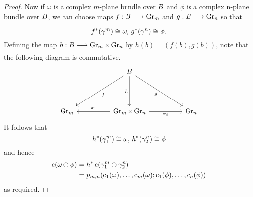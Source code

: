 \documentclass[../main]{subfiles}
\begin{document}
\begin{proof}
Now if $\omega$ is a complex $m$-plane bundle over $B$ and $\phi$ is a complex n-plane bundle over $B$, we can choose maps $f: \base \varrightarrow{} \grassmannian_{m}$ and $g: \base \varrightarrow{} \grassmannian_{n}$ so that
\[
f^{*}(\gamma^{m}) \cong \omega, \, g^{*}(\gamma^{n}) \cong \phi .
\]
Defining the map $h: \base \varrightarrow{} \grassmannian_{m} \times \grassmannian_{n}$ by $h(b)=(f(b), g(b))$, note that the following diagram is commutative.
\[\begin{tikzcd}
	&& \base \\
	{} \\
	{\grassmannian_m} && {\grassmannian_m \times \grassmannian_n} && {\grassmannian_n}
	\arrow["f", from=1-3, to=3-1]
	\arrow["g"', from=1-3, to=3-5]
	\arrow["h"', from=1-3, to=3-3]
	\arrow["{\pi_1}"', from=3-3, to=3-1]
	\arrow["{\pi_2}"', from=3-3, to=3-5]
\end{tikzcd}\]
It follows that
\[
h^{*}(\gamma_{1}^{m}) \cong \omega,\, h^{*}(\gamma_{2}^{n}) \cong \phi
\]
and hence
\[
\begin{aligned}
\operatorname{c}(\omega \oplus \phi) &=h^{*} \operatorname{c}(\gamma_{1}^{m}\oplus  \gamma_{2}^{n}) \\
&=p_{m, n}(\operatorname{c}_{1}(\omega), \ldots, \operatorname{c}_{m}(\omega) ; \operatorname{c}_{1}(\phi), \ldots, \operatorname{c}_{n}(\phi))
\end{aligned}
\]
as required.\end{proof}
\end{document}
